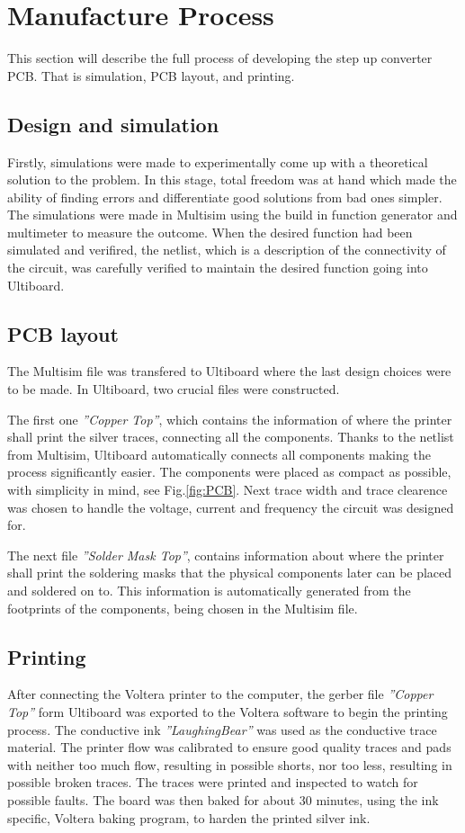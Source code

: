 \section{Manufacture Process}
This section will describe the full process of developing the step up converter PCB\@. That is simulation, PCB layout, and printing.\
\subsection{Design and simulation}
Firstly, simulations were made to experimentally come up with a theoretical solution to the problem. In this stage, total freedom was at hand which made the ability of finding errors and differentiate good solutions from bad ones simpler. The simulations were made in Multisim using the build in function generator and multimeter to measure the outcome. When the desired function had been simulated and verifired, the netlist, which is a description of the connectivity of the circuit, was carefully verified to maintain the desired function going into Ultiboard.
\subsection{PCB layout}
The Multisim file was transfered to Ultiboard where the last design choices were to be made. In Ultiboard, two crucial files were constructed.

The first one \textit{''Copper Top''}, which contains the information of where the printer shall print the silver traces, connecting all the components. Thanks to the netlist from Multisim, Ultiboard automatically connects all components making the process significantly easier. The components were placed as compact as possible, with simplicity in mind, see Fig.\ref{fig:PCB}. Next trace width and trace clearence was chosen to handle the voltage, current and frequency the circuit was designed for.

The next file \textit{''Solder Mask Top''}, contains information about where the printer shall print the soldering masks that the physical components later can be placed and soldered on to. This information is automatically generated from the footprints of the components, being chosen in the Multisim file.
\subsection{Printing}
After connecting the Voltera printer to the computer, the gerber file \textit{''Copper Top''} form Ultiboard was exported to the Voltera software to begin the printing process. The conductive ink \textit{''LaughingBear''} was used as the conductive trace material. The printer flow was calibrated to ensure good quality traces and pads with neither too much flow, resulting in possible shorts, nor too less, resulting in possible broken traces. The traces were printed and inspected to watch for possible faults. The board was then baked for about 30 minutes, using the ink specific, Voltera baking program, to harden the printed silver ink.

